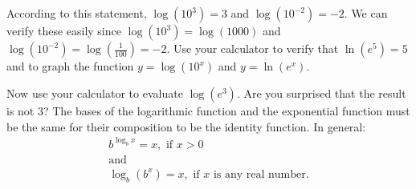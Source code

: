 \documentclass[10pt,]{book}
\theoremstyle{plain}
\theoremstyle{definition}
\theoremstyle{definition}
\theoremstyle{definition}
\numberwithin{equation}{section}
\newcommand{\gt}{>}
\begin{document}
According to this statement, \(\log \left( 10^3 \right) = 3\) and \(\log \left( 10^{-2} \right) = -2\). We can verify these easily since \(\log \left( 10^3 \right) = \log \left( 1000 \right)\) and \(\log \left( 10^{-2} \right) = \log \left( \frac{1}{100} \right) = -2\). Use your calculator to verify that \(\ln \left( e^5 \right) = 5\) and to graph the function \(y = \log \left( 10^x \right)\) and \(y = \ln \left( e^x \right)\).%
\par
\hypertarget{p-335}{}%
Now use your calculator to evaluate \(\log \left( e^3 \right)\).  Are you surprised that the result is not \(3\)? The bases of the logarithmic function and the exponential function must be the same for their composition to be the identity function. In general:%
\begin{gather*}
b ^ {\log_b x} = x, \text{ if } x \gt 0\\
\text{and}\\
\log_b \left( b^x \right) = x, \text{ if } x \text{ is any real number.}
\end{gather*}
%
\typeout{************************************************}
\typeout{************************************************}
\end{document}
